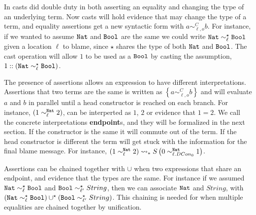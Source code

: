
In  casts did double duty in both asserting an equality and changing the type of an underlying term.
Now casts will hold evidence that may change the type of a term, and equality assertions get a new syntactic form with $a\sim_{\ell,o}^{C}b$.
For instance, if we wanted to assume $\mathtt{Nat}{} $ and $\mathtt{Bool}{} $ are the same we could write $\mathtt{Nat}{} \sim_{\ell}^{\star}\mathtt{Bool}{} $ given a location $\ell$ to blame, since $\star$ shares the type of both $\mathtt{Nat}{} $ and $\mathtt{Bool}{} $.
The cast operation will allow $1$ to be used as a $\mathtt{Bool}{} $ by casting the assumption, $1::\left(\mathtt{Nat}{} \sim_{\ell}^{\star}\mathtt{Bool}{} \right)$.

The presence of assertions allows an expression to have different interpretations.
Assertions that two terms are the same is written as $\left\{ a\sim_{\ell,o}^{C}b\right\}$ and will evaluate $a$ and $b$ in parallel until a head constructor is reached on each branch. 
For instance, $\left(1 \sim_{\ell}^{\mathtt{Nat}{}} 2 \right)$, can be interperted as $1$, $2$ or evidence that $1=2$.
We call the concrete interpretations \textbf{endpoint}s, and they will be formalized in the next section.
If the constructor is the same it will commute out of the term.
If the head constructor is different the term will get stuck with the information for the final blame message.
For instance, $\left(1 \sim_{\ell}^{\mathtt{Nat}{}} 2 \right)\rightsquigarrow_{*} S\left(0 \sim_{\ell.DCon_{0}}^{\mathtt{Nat}{}} 1\right) $.


Assertions can be chained together with $\cup$ when two expressions that share an endpoint, and evidence that the types are the same.
For instance if we assumed $\mathtt{Nat}{} \sim_{\ell}^{\star}\mathtt{Bool}{} $ and $\mathtt{Bool}{} \sim_{\ell'}^{\star}String$, then we can associate $\mathtt{Nat}{} $ and $String$, with $\left(\mathtt{Nat}{} \sim_{\ell}^{\star}\mathtt{Bool}{} \right)\cup^{\star}\left(\mathtt{Bool}{} \sim_{\ell'}^{\star}String\right)$.
This chaining is needed for when multiple equalities are chained together by unification.

